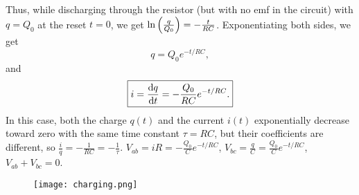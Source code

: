 Thus, while discharging through the resistor (but with no emf in the circuit) with $q = Q_0$ at the reset $t=0$, we get $\ln\left( \frac{q}{Q_0} \right) = -\frac{t}{RC}$. Exponentiating both sides, we get
\begin{equation}
\boxed{ q = Q_0 e^{-t/RC}, }
\end{equation}
and
\begin{equation}
\boxed{ i = \dfrac{\operatorname{d\!} q}{\operatorname{d\!} t} = -\dfrac{Q_0}{RC}e^{-t/RC}. }
\end{equation}
In this case, both the charge $q(t)$ and the current $i(t)$ exponentially decrease toward zero with the same time constant $\tau = RC$, but their coefficients are different, so $\frac{i}{q} = -\frac{1}{RC} = -\frac{1}{\tau}$. $V_{ab} = iR = -\frac{Q_0}{C} e^{-t/RC}$, $V_{bc} = \frac{q}{C} = \frac{Q_0}{C} e^{-t/RC}$, $V_{ab} + V_{bc} = 0$.
\begin{figure}[h]
\centering
\texttt{[image: charging.png]}
\end{figure}